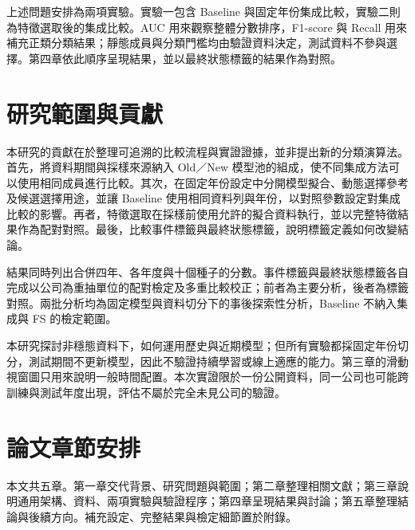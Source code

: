 上述問題安排為兩項實驗。實驗一包含 Baseline 與固定年份集成比較，實驗二則為特徵選取後的集成比較。AUC 用來觀察整體分數排序，F1-score 與 Recall 用來補充正類分類結果；靜態成員與分類門檻均由驗證資料決定，測試資料不參與選擇。第四章依此順序呈現結果，並以最終狀態標籤的結果作為對照。

\section{研究範圍與貢獻}

本研究的貢獻在於整理可追溯的比較流程與實證證據，並非提出新的分類演算法。首先，將資料期間與採樣來源納入 Old／New 模型池的組成，使不同集成方法可以使用相同成員進行比較。其次，在固定年份設定中分開模型擬合、動態選擇參考及候選選擇用途，並讓 Baseline 使用相同資料列與年份，以對照參數設定對集成比較的影響。再者，特徵選取在採樣前使用允許的擬合資料執行，並以完整特徵結果作為配對對照。最後，比較事件標籤與最終狀態標籤，說明標籤定義如何改變結論。

結果同時列出合併四年、各年度與十個種子的分數。事件標籤與最終狀態標籤各自完成以公司為重抽單位的配對檢定及多重比較校正；前者為主要分析，後者為標籤對照。兩批分析均為固定模型與資料切分下的事後探索性分析，Baseline 不納入集成與 FS 的檢定範圍。

本研究探討非穩態資料下，如何運用歷史與近期模型；但所有實驗都採固定年份切分，測試期間不更新模型，因此不驗證持續學習或線上適應的能力。第三章的滑動視窗圖只用來說明一般時間配置。本次實證限於一份公開資料，同一公司也可能跨訓練與測試年度出現，評估不屬於完全未見公司的驗證。

\section{論文章節安排}

本文共五章。第一章交代背景、研究問題與範圍；第二章整理相關文獻；第三章說明通用架構、資料、兩項實驗與驗證程序；第四章呈現結果與討論；第五章整理結論與後續方向。補充設定、完整結果與檢定細節置於附錄。
\endgroup
